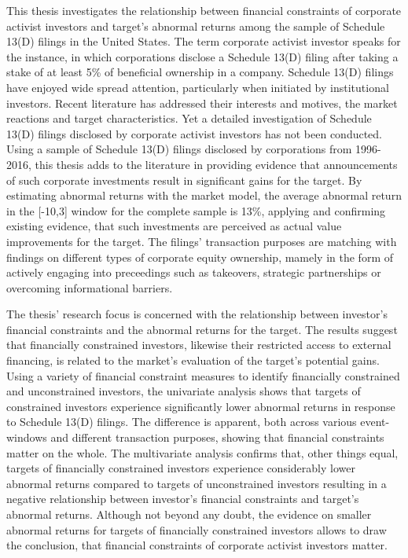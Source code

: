 \documentclass[12pt]{article}
\begin{document}
\noindent This thesis investigates the relationship between financial constraints of corporate activist investors and target's abnormal returns among the sample of Schedule 13(D) filings in the United States. The term corporate activist investor speaks for the instance, in which corporations disclose a Schedule 13(D) filing after taking a stake of at least 5\% of beneficial ownership in a company. Schedule 13(D) filings have enjoyed wide spread attention, particularly when initiated by institutional investors. Recent literature has addressed their interests and motives, the market reactions and target characteristics. Yet a detailed investigation of Schedule 13(D) filings disclosed by corporate activist investors has not been conducted. Using a sample of Schedule 13(D) filings disclosed by corporations from 1996-2016, this thesis adds to the literature in providing evidence that announcements of such corporate investments result in significant gains for the target. By estimating abnormal returns with the market model, the average abnormal return in the [-10,3] window for the complete sample is 13\%, applying and confirming existing evidence, that such investments are perceived as actual value improvements for the target. The filings' transaction purposes are matching with findings on different types of corporate equity ownership, mamely in the form of actively engaging into preceedings such as takeovers, strategic partnerships or overcoming informational barriers.\par 
The thesis' research focus is concerned with the relationship between investor's financial constraints and the abnormal returns for the target. The results suggest that financially constrained investors, likewise their restricted access to external financing, is related to the market's evaluation of the target's potential gains. Using a variety of financial constraint measures to identify financially constrained and unconstrained investors, the univariate analysis shows that targets of constrained investors experience significantly lower abnormal returns in response to Schedule 13(D) filings. The difference is apparent, both across various event-windows and different transaction purposes, showing that financial constraints matter on the whole. The multivariate analysis confirms that, other things equal, targets of financially constrained investors experience considerably lower abnormal returns compared to targets of unconstrained investors resulting in a negative relationship between investor's financial constraints and target's abnormal returns. Although not beyond any doubt, the evidence on smaller abnormal returns for targets of financially constrained investors allows to draw the conclusion, that financial constraints of corporate activist investors matter.\\ 
\end{document}
